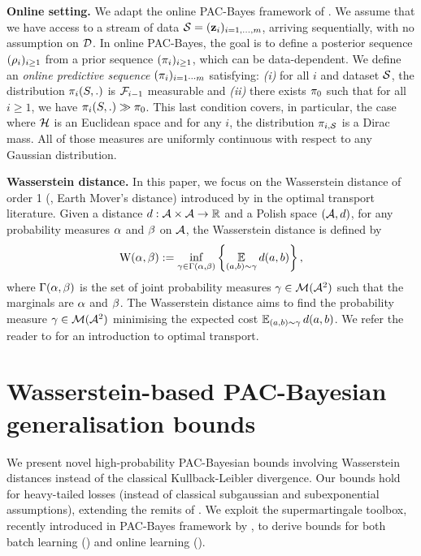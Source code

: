 \documentclass{article}
\begin{document}
\textbf{Online setting.} 
We adapt the online PAC-Bayes framework of \cite{haddouche2022online}.
We assume that we have access to a stream of data $\S=(\z_i)_{i=1,\dots,m}$, arriving sequentially, with no assumption on $\Dcal$.
In online PAC-Bayes, the goal is to define a posterior sequence $(\Q_i)_{i\geq 1}$ from a prior sequence $(\P_i)_{i\geq 1}$, which can be data-dependent.
We define an \emph{online predictive sequence} $(\P_i)_{i=1\cdots m}$ satisfying: {\it (i)} for all $i$ and dataset $\S$, the distribution $\P_i(S,.)$ is $\Fcal_{i-1}$ measurable and {\it (ii)} there exists $\P_0$ such that for all $i \geq 1$, we have $\P_i(S,.)\gg \P_{0}$. 
This last condition covers, in particular, the case where $\H$ is an Euclidean space and for any $i$, the distribution $\P_{i,\S}$ is a Dirac mass. 
All of those measures are uniformly continuous with respect to any Gaussian distribution.

\textbf{Wasserstein distance.}
In this paper, we focus on the Wasserstein distance of order 1 (\aka, Earth Mover's distance) introduced by \cite{kantorovich1960mathematical} in the optimal transport literature. 
Given a distance $d: \Acal\times\Acal \to \R$ and a Polish space $(\Acal, d)$, for any probability measures $\AQ$ and $\BQ$ on $\Acal$, the Wasserstein distance is defined by
\begin{align}
\W(\AQ, \BQ) \defeq \inf_{\gamma\in \Gamma(\AQ, \BQ)}\LC 
\EE_{(a, b)\sim\gamma}d(a, b)\RC,\label{eq:wasserstein}
\end{align}
where $\Gamma(\AQ, \BQ)$ is the set of joint probability measures $\gamma \in \Mcal(\Acal^2)$ such that the marginals are $\AQ$ and $\BQ$.
The Wasserstein distance aims to find the probability measure $\gamma\in\Mcal(\Acal^2)$ minimising the expected cost $\EE_{(a, b)\sim\gamma}d(a, b)$.
We refer the reader to \cite{villani2009optimal,peyre2019computational} for an introduction to optimal transport.

\section{Wasserstein-based PAC-Bayesian generalisation bounds}
\label{sec:wasserstein}

We present novel high-probability PAC-Bayesian bounds involving Wasserstein distances instead of the classical Kullback-Leibler divergence. 
Our bounds hold for heavy-tailed losses (instead of classical subgaussian and subexponential assumptions), extending the remits of \cite[Theorem 11]{amit2022integral}.
We exploit the supermartingale toolbox, recently introduced in PAC-Bayes framework by \cite{haddouche2023pac,chugg2023unified,jang2023tighter}, to derive bounds for both batch learning () and online learning ().
\end{document}
